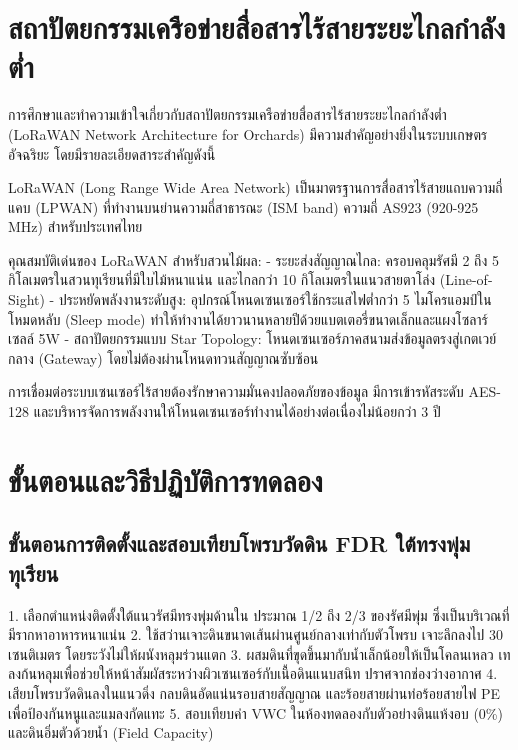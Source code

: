 \section{สถาปัตยกรรมเครือข่ายสื่อสารไร้สายระยะไกลกำลังต่ำ}

การศึกษาและทำความเข้าใจเกี่ยวกับสถาปัตยกรรมเครือข่ายสื่อสารไร้สายระยะไกลกำลังต่ำ (LoRaWAN Network Architecture for Orchards) มีความสำคัญอย่างยิ่งในระบบเกษตรอัจฉริยะ โดยมีรายละเอียดสาระสำคัญดังนี้

LoRaWAN (Long Range Wide Area Network) เป็นมาตรฐานการสื่อสารไร้สายแถบความถี่แคบ (LPWAN) ที่ทำงานบนย่านความถี่สาธารณะ (ISM band) ความถี่ AS923 (920-925 MHz) สำหรับประเทศไทย

คุณสมบัติเด่นของ LoRaWAN สำหรับสวนไม้ผล:
- ระยะส่งสัญญาณไกล: ครอบคลุมรัศมี 2 ถึง 5 กิโลเมตรในสวนทุเรียนที่มีใบไม้หนาแน่น และไกลกว่า 10 กิโลเมตรในแนวสายตาโล่ง (Line-of-Sight)
- ประหยัดพลังงานระดับสูง: อุปกรณ์โหนดเซนเซอร์ใช้กระแสไฟต่ำกว่า 5 ไมโครแอมป์ในโหมดหลับ (Sleep mode) ทำให้ทำงานได้ยาวนานหลายปีด้วยแบตเตอรี่ขนาดเล็กและแผงโซลาร์เซลล์ 5W
- สถาปัตยกรรมแบบ Star Topology: โหนดเซนเซอร์ภาคสนามส่งข้อมูลตรงสู่เกตเวย์กลาง (Gateway) โดยไม่ต้องผ่านโหนดทวนสัญญาณซับซ้อน

\begin{techbox}
การเชื่อมต่อระบบเซนเซอร์ไร้สายต้องรักษาความมั่นคงปลอดภัยของข้อมูล มีการเข้ารหัสระดับ AES-128 และบริหารจัดการพลังงานให้โหนดเซนเซอร์ทำงานได้อย่างต่อเนื่องไม่น้อยกว่า 3 ปี
\end{techbox}

\section{ขั้นตอนและวิธีปฏิบัติการทดลอง}

\subsection{ขั้นตอนการติดตั้งและสอบเทียบโพรบวัดดิน FDR ใต้ทรงพุ่มทุเรียน}
\begin{sensorbox}
1. เลือกตำแหน่งติดตั้งใต้แนวรัศมีทรงพุ่มด้านใน ประมาณ 1/2 ถึง 2/3 ของรัศมีพุ่ม ซึ่งเป็นบริเวณที่มีรากหาอาหารหนาแน่น
2. ใช้สว่านเจาะดินขนาดเส้นผ่านศูนย์กลางเท่ากับตัวโพรบ เจาะลึกลงไป 30 เซนติเมตร โดยระวังไม่ให้ผนังหลุมร่วนแตก
3. ผสมดินที่ขุดขึ้นมากับน้ำเล็กน้อยให้เป็นโคลนเหลว เทลงก้นหลุมเพื่อช่วยให้หน้าสัมผัสระหว่างผิวเซนเซอร์กับเนื้อดินแนบสนิท ปราศจากช่องว่างอากาศ
4. เสียบโพรบวัดดินลงในแนวดิ่ง กลบดินอัดแน่นรอบสายสัญญาณ และร้อยสายผ่านท่อร้อยสายไฟ PE เพื่อป้องกันหนูและแมลงกัดแทะ
5. สอบเทียบค่า VWC ในห้องทดลองกับตัวอย่างดินแห้งอบ (0\%) และดินอิ่มตัวด้วยน้ำ (Field Capacity)
\end{sensorbox}

